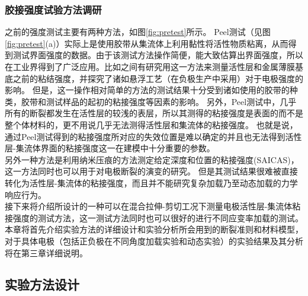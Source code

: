 \subsubsection{胶接强度试验方法调研}
之前的强度测试主要有两种方法，如图\ref{fig:pretest}所示。 Peel测试（见图\ref{fig:pretest}(a)）实际上是使用胶带从集流体上利用黏性将活性物质粘离，从而得到测试界面强度的数据。由于该测试方法操作简便，能大致估算出界面强度，所以在工业界得到了广泛应用。比如之间有研究用这一方法来测量活性层和金属薄膜基底之前的粘结强度，并探究了诸如悬浮工艺（在负极生产中采用）对于电极强度的影响\cite{Park2011Effect}。 但是，这一操作相对简单的方法的测试结果十分受到诸如使用的胶带的种类，胶带和测试样品的起初的粘接强度等因素的影响。 另外，Peel测试中，几乎所有的断裂都发生在活性层的较浅的表层，所以其测得的粘接强度是表面的而不是整个体材料的，更不用说几乎无法测得活性层和集流体的粘接强度。 也就是说，通过Peel测试得到的粘接强度所对应的失效位置是难以确定的并且也无法得到活性层-集流体界面的粘接强度这一在建模中十分重要的参数。\\
\indent 另外一种方法是利用纳米压痕的方法测定给定深度和位置的粘接强度(SAICAS\cite{Son2014Measurement})，这一方法同时也可以用于对电极断裂的演变的研究\cite{Saito2010An}。 但是其测试结果很难被直接转化为活性层-集流体的粘接强度，而且并不能研究复杂加载乃至动态加载的力学响应行为。\\
\indent 接下来将介绍所设计的一种可以在混合拉伸-剪切工况下测量电极活性层-集流体粘接强度的测试方法，这一测试方法同时也可以很好的进行不同应变率加载的测试。 本章将首先介绍实验方法的详细设计和实验分析所会用到的断裂准则和材料模型，对于具体电极（包括正负极在不同角度加载实验和动态实验）的实验结果及其分析将在第三章详细说明。
\subsection{实验方法设计}
